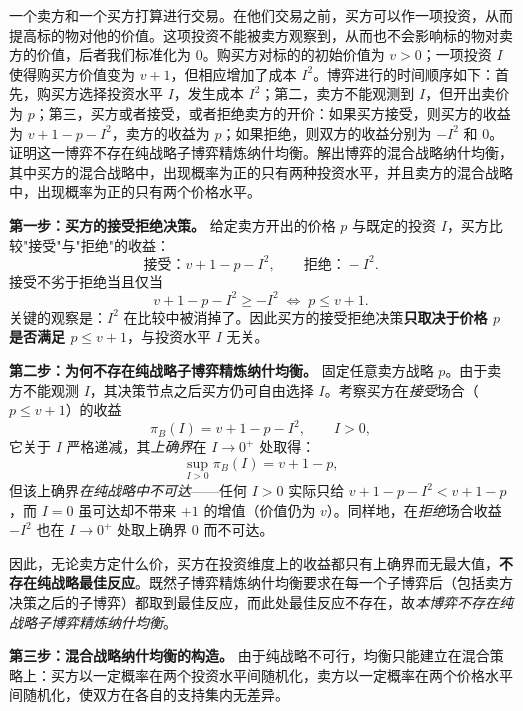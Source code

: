 一个卖方和一个买方打算进行交易。在他们交易之前，买方可以作一项投资，从而提高标的物对他的价值。这项投资不能被卖方观察到，从而也不会影响标的物对卖方的价值，后者我们标准化为 $0$。购买方对标的的初始价值为 $v>0$；一项投资 $I$ 使得购买方价值变为 $v+1$，但相应增加了成本 $I^2$。博弈进行的时间顺序如下：首先，购买方选择投资水平 $I$，发生成本 $I^2$；第二，卖方不能观测到 $I$，但开出卖价为 $p$；第三，买方或者接受，或者拒绝卖方的开价：如果买方接受，则买方的收益为 $v+1-p-I^2$，卖方的收益为 $p$；如果拒绝，则双方的收益分别为 $-I^2$ 和 $0$。证明这一博弈不存在纯战略子博弈精炼纳什均衡。解出博弈的混合战略纳什均衡，其中买方的混合战略中，出现概率为正的只有两种投资水平，并且卖方的混合战略中，出现概率为正的只有两个价格水平。

\sol
\textbf{第一步：买方的接受\/拒绝决策。} 给定卖方开出的价格 $p$ 与既定的投资 $I$，买方比较"接受"与"拒绝"的收益：
\[
\text{接受：}v+1-p-I^2,\qquad \text{拒绝：}-I^2.
\]\indent
接受不劣于拒绝当且仅当
\[
v+1-p-I^2\ge -I^2\;\Longleftrightarrow\; p\le v+1.
\]\indent
关键的观察是：$I^2$ 在比较中被消掉了。因此买方的接受\/拒绝决策\textbf{只取决于价格 $p$ 是否满足 $p\le v+1$}，与投资水平 $I$ 无关。

\textbf{第二步：为何不存在纯战略子博弈精炼纳什均衡。} 固定任意卖方战略 $p$。由于卖方不能观测 $I$，其决策节点之后买方仍可自由选择 $I$。考察买方在\emph{接受}场合（$p\le v+1$）的收益
\[
\pi_B(I)=v+1-p-I^2,\qquad I>0,
\]\indent
它关于 $I$ 严格递减，其\emph{上确界}在 $I\to 0^+$ 处取得：
\[
\sup_{I>0}\pi_B(I)=v+1-p,
\]\indent
但该上确界\emph{在纯战略中不可达}——任何 $I>0$ 实际只给 $v+1-p-I^2<v+1-p$，而 $I=0$ 虽可达却不带来 $+1$ 的增值（价值仍为 $v$）。同样地，在\emph{拒绝}场合收益 $-I^2$ 也在 $I\to0^+$ 处取上确界 $0$ 而不可达。

因此，无论卖方定什么价，买方在投资维度上的收益都只有上确界而无最大值，\textbf{不存在纯战略最佳反应}。既然子博弈精炼纳什均衡要求在每一个子博弈后（包括卖方决策之后的子博弈）都取到最佳反应，而此处最佳反应不存在，故\emph{本博弈不存在纯战略子博弈精炼纳什均衡}。


\textbf{第三步：混合战略纳什均衡的构造。} 由于纯战略不可行，均衡只能建立在混合策略上：买方以一定概率在两个投资水平间随机化，卖方以一定概率在两个价格水平间随机化，使双方在各自的支持集内无差异。

